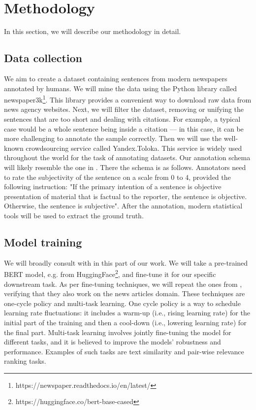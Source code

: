\documentclass[conference]{IEEEtran}
\begin{document}
\section{Methodology}
In this section, we will describe our methodology in detail.
\subsection{Data collection}
We aim to create a dataset containing sentences from modern newspapers annotated by humans. We will mine the data using the Python library called newspaper3k\footnote{https://newspaper.readthedocs.io/en/latest/}. This library provides a convenient way to download raw data from news agency websites. Next, we will filter the dataset, removing or unifying the sentences that are too short and dealing with citations. For example, a typical case would be a whole sentence being inside a citation --- in this case, it can be more challenging to annotate the sample correctly. Then we will use the well-known crowdsourcing service called Yandex.Toloka. This service is widely used throughout the world for the task of annotating datasets. Our annotation schema will likely resemble the one in \cite{mpqa-opinion}. There the schema is as follows. Annotators need to rate the subjectivity of the sentence on a scale from 0 to 4, provided the following instruction: "If the primary intention of a sentence is objective presentation of material that is factual to the reporter, the sentence is objective. Otherwise, the sentence is subjective". After the annotation, modern statistical tools will be used to extract the ground truth.

\subsection{Model training}
We will broadly consult with \cite{bert-finetune} in this part of our work. We will take a pre-trained BERT model, e.g. from HuggingFace\footnote{https://huggingface.co/bert-base-cased}, and fine-tune it for our specific downstream task. As per fine-tuning techniques, we will repeat the ones from \cite{bert-finetune}, verifying that they also work on the news articles domain. These techniques are one-cycle policy and multi-task learning. One cycle policy is a way to schedule learning rate fluctuations: it includes a warm-up (i.e., rising learning rate) for the initial part of the training and then a cool-down (i.e., lowering learning rate) for the final part. Multi-task learning involves jointly fine-tuning the model for different tasks, and it is believed to improve the models' robustness and performance. Examples of such tasks are text similarity and pair-wise relevance ranking tasks.
\end{document}
